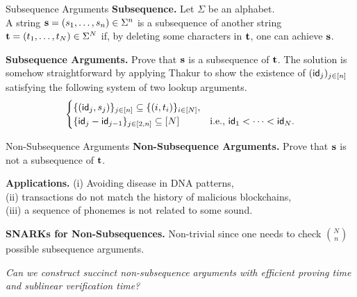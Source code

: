 \begin{frame}{Subsequence Arguments}
	\textbf{Subsequence.} Let $\Sigma$ be an alphabet. \\
	A string $\mathbf{s} = (s_1, \dots, s_n) \in \Sigma^n$ is a subsequence of another string $\mathbf{t} = (t_1, \dots, t_N) \in \Sigma^N$ if, by deleting some characters in $\mathbf{t}$, one can achieve $\mathbf{s}$.
	
	\textbf{Subsequence Arguments.} Prove that $\mathbf{s}$ is a subsequence of $\mathbf{t}$. The solution is somehow straightforward by applying Thakur \cite{EPRINT:Thakur23} to show the existence of $(\mathsf{id}_j)_{j \in [n]}$ satisfying the following system of two lookup arguments.
	\begin{equation*}
		\begin{cases}
			\{(\mathsf{id}_j, s_j)\}_{j \in [n]} \subseteq \{(i, t_i)\}_{i \in [N]},\\
			\{\mathsf{id}_j - \mathsf{id}_{j - 1}\}_{j \in [2, n]} \subseteq [N] &\text{i.e., $\mathsf{id}_1 < \dots < \mathsf{id}_N$}.
		\end{cases}
	\end{equation*}
\end{frame}

\begin{frame}{Non-Subsequence Arguments}
	\textbf{Non-Subsequence Arguments.} Prove that $\mathbf{s}$ is not a subsequence of $\mathbf{t}$.
	
	\textbf{Applications.} (i) Avoiding disease in DNA patterns,\\ (ii) transactions do not match the history of malicious blockchains,\\ (iii) a sequence of phonemes is not related to some sound.
	
	\textbf{SNARKs for Non-Subsequences.} Non-trivial since one needs to check $\binom{N}{n}$ possible subsequence arguments.
	
	\pause
	\begin{center}
		\emph{Can we construct succinct non-subsequence arguments with efficient proving time and sublinear verification time?}
	\end{center}
\end{frame}